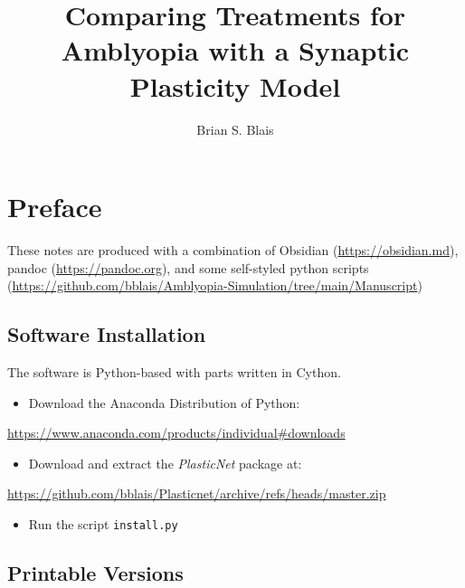 \documentclass[
  onecolumn]{article}
\title{Comparing Treatments for Amblyopia with a Synaptic Plasticity
Model}
\author{Brian S. Blais}
\date{}
\providecommand{\tightlist}{%
  \setlength{\itemsep}{0pt}\setlength{\parskip}{0pt}}
\begin{document}
\maketitle

{
\hypersetup{linkcolor=}
\setcounter{tocdepth}{3}
\tableofcontents
}
\hypertarget{preface}{%
\section*{Preface}\label{preface}}

These notes are produced with a combination of Obsidian
(\url{https://obsidian.md}), pandoc (\url{https://pandoc.org}), and some
self-styled python scripts
(\url{https://github.com/bblais/Amblyopia-Simulation/tree/main/Manuscript})

\hypertarget{software-installation}{%
\subsection*{Software Installation}\label{software-installation}}

The software is Python-based with parts written in Cython.

\begin{itemize}
\tightlist
\item
  Download the Anaconda Distribution of Python:
\end{itemize}

\url{https://www.anaconda.com/products/individual\#downloads}

\begin{itemize}
\tightlist
\item
  Download and extract the \emph{PlasticNet} package at:
\end{itemize}

\url{https://github.com/bblais/Plasticnet/archive/refs/heads/master.zip}

\begin{itemize}
\tightlist
\item
  Run the script \texttt{install.py}
\end{itemize}

\hypertarget{printable-versions}{%
\subsection*{Printable Versions}\label{printable-versions}}
\end{document}
